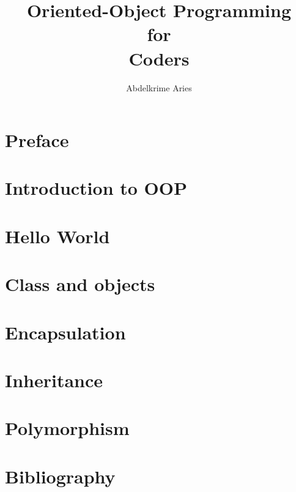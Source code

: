 \documentclass{KodeBook}
\title{Oriented-Object Programming\\ for\\ Coders}
\author{Abdelkrime Aries}
\begin{document}
\maketitle



\chapter*{Preface}


\chapter{Introduction to OOP}


\chapter{Hello World}


\chapter{Class and objects}


\chapter{Encapsulation}


\chapter{Inheritance}



\chapter{Polymorphism}


%


\chapter*{Bibliography}

%
\end{document}
